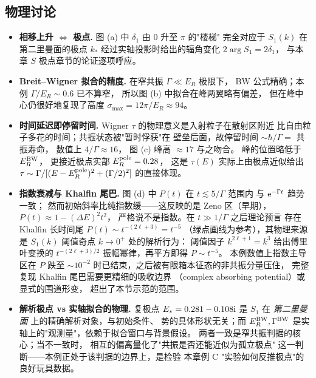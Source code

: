 \subsection*{物理讨论}
\begin{itemize}
  \item \textbf{相移上升 $\Leftrightarrow$ 极点.}
    图 (a) 中 $\delta_{1}$ 由 $0$ 升至 $\pi$ 的"楼梯"
    完全对应于 $S_{1}(k)$ 在第二里曼面的极点 $k_{*}$
    经过实轴投影时给出的辐角变化 $2\arg S_{1}=2\delta_{1}$，
    与本章 $S$ 极点章节的论证逐项呼应。
  \item \textbf{Breit--Wigner 拟合的精度.}
    在窄共振 $\Gamma\ll E_{R}$ 极限下，
    BW 公式精确；本例 $\Gamma/E_{R}\sim 0.6$ 已不算窄，
    所以图 (b) 中拟合在峰两翼略有偏差，
    但在峰中心仍很好地复现了高度
    $\sigma_{\max}=12\pi/E_{R}\approx 94$。
  \item \textbf{时间延迟即停留时间.}
    Wigner $\tau$ 的物理意义是入射粒子在散射区附近
    比自由粒子多花的时间；共振状态被"暂时俘获"在
    壁垒后面，故停留时间 $\sim \hbar/\Gamma=$ 共振寿命，
    数值上 $4/\Gamma\approx 16$，
    图 (c) 峰高 $\approx 17$ 与之吻合。
    峰的位置略低于 $E_{R}^{\rm BW}$，
    更接近极点实部 $E_{R}^{\rm pole}=0.28$，
    这是 $\tau(E)$ 实际上由极点近似给出
    $\tau\sim \Gamma/[(E-E_{R}^{\rm pole})^{2}+(\Gamma/2)^{2}]$
    的直接体现。
  \item \textbf{指数衰减与 Khalfin 尾巴.}
    图 (d) 中 $P(t)$ 在 $t\lesssim 5/\Gamma$ 范围内
    与 $\mathrm{e}^{-\Gamma t}$ 趋势一致；
    然而初始斜率比纯指数缓——这反映的是
    Zeno 区（早期），$P(t)\approx 1-(\Delta E)^{2}t^{2}$，
    严格说不是指数。在 $t\gg 1/\Gamma$ 之后理论预言
    存在 Khalfin 长时间尾 $P(t)\sim t^{-(2\ell+3)}=t^{-5}$
    （绿点画线为参考），其物理来源是
    $S_{1}(k)$ 阈值奇点 $k\to 0^{+}$ 处的解析行为：
    阈值因子 $k^{2\ell+1}=k^{3}$ 给出傅里叶变换的
    $t^{-(2\ell+3)/2}$ 振幅幂律，再平方即得 $P\sim t^{-5}$。
    本例数值上指数主导区在 $P$ 跌至 $\sim 10^{-2}$
    时已结束，之后被有限箱本征态的非共振分量压住，
    完整复现 Khalfin 尾巴需要更精细的吸收边界
    （complex absorbing potential）或显式的围道形变，
    超出了本节示范的范围。
  \item \textbf{解析极点 vs 实轴拟合的物理.}
    复极点 $E_{*}=0.281-0.108\mathrm{i}$ 是 $S_{1}$ 在
    \emph{第二里曼面} 上的精确解析对象，与初始条件、
    势的具体形状无关；而 $E_{R}^{\rm BW},\Gamma^{\rm BW}$
    是实轴上的"观测量"，依赖于拟合窗口与背景假设。
    两者一致是窄共振判据的核心；当不一致时，
    相互的偏离量化了"共振是否还能近似为孤立极点"
    这一判断——本例正处于该判据的边界上，是检验
    本章例 C "实验如何反推极点"的良好玩具数据。
\end{itemize}

